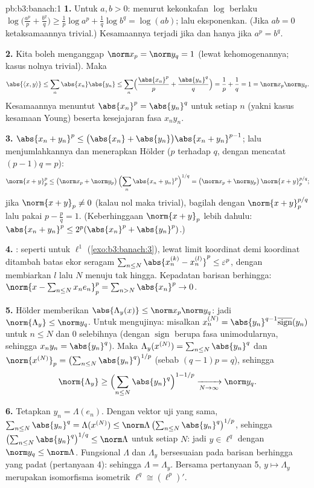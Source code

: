 \begin{solution}{pb:b3:banach:1}
\textbf{1.} Untuk $a, b > 0$: menurut kekonkafan $\log$ berlaku
$\log\bigl(\tfrac{a^p}p + \tfrac{b^q}q\bigr) \geq \tfrac1p\log
a^p + \tfrac1q\log b^q = \log(ab)$; lalu eksponenkan. (Jika $ab = 0$
ketaksamaannya trivial.) Kesamaannya terjadi jika dan hanya jika $a^p = b^q$.

\textbf{2.} Kita boleh menganggap $\norm x_p = \norm y_q = 1$
(lewat kehomogenannya; kasus nolnya trivial). Maka
\[
\abs{\langle x, y\rangle} \leq \sum_n\abs{x_n}\abs{y_n}
\leq \sum_n\Bigl(\frac{\abs{x_n}^p}p +
\frac{\abs{y_n}^q}q\Bigr) = \frac1p + \frac1q = 1 =
\norm x_p\norm y_q .
\]
Kesamaannya menuntut $\abs{x_n}^p = \abs{y_n}^q$ untuk setiap $n$
(yakni kasus kesamaan Young) beserta kesejajaran fasa
$x_ny_n$.

\textbf{3.} $\abs{x_n + y_n}^p \leq \bigl(\abs{x_n} +
\abs{y_n}\bigr)\abs{x_n + y_n}^{p-1}$; lalu menjumlahkannya dan menerapkan
Hölder ($p$ terhadap $q$, dengan mencatat $(p - 1)q = p$):
\[
\norm{x + y}_p^p \leq \bigl(\norm x_p + \norm
y_p\bigr)\,\Bigl(\sum_n\abs{x_n + y_n}^{p}\Bigr)^{1/q}
= \bigl(\norm x_p + \norm y_p\bigr)\,\norm{x+y}_p^{p/q};
\]
jika $\norm{x + y}_p \neq 0$ (kalau nol maka trivial), bagilah dengan
$\norm{x+y}_p^{p/q}$ lalu pakai $p - \frac pq = 1$. (Keberhinggaan
$\norm{x+y}_p$ lebih dahulu: $\abs{x_n+y_n}^p \leq
2^p(\abs{x_n}^p + \abs{y_n}^p)$.)

\textbf{4.} : seperti untuk $\ell^1$
(\cref{exo:b3:banach:3}), lewat limit koordinat demi koordinat ditambah
batas ekor seragam $\sum_{n\leq N}\abs{x^{(k)}_n - x^{(l)}_n}^p
\leq \varepsilon^p$, dengan membiarkan $l$ lalu $N$ menuju tak hingga.
Kepadatan barisan berhingga: $\norm{x - \sum_{n\leq
N}x_ne_n}_p^p = \sum_{n > N}\abs{x_n}^p \to 0$.

\textbf{5.} Hölder memberikan $\abs{\Lambda_y(x)} \leq \norm
x_p\norm y_q$: jadi $\norm{\Lambda_y} \leq \norm y_q$. Untuk mengujinya: misalkan
$x^{(N)}_n = \abs{y_n}^{q-1}\overline{\operatorname{sign}}(y_n)$
untuk $n \leq N$ dan $0$ selebihnya (dengan $\operatorname{sign}$ berupa
fasa unimodularnya, sehingga $x_ny_n = \abs{y_n}^q$). Maka
$\Lambda_y(x^{(N)}) = \sum_{n\leq N}\abs{y_n}^q$ dan
$\norm{x^{(N)}}_p = \bigl(\sum_{n\leq
N}\abs{y_n}^{q}\bigr)^{1/p}$ (sebab $(q-1)p = q$), sehingga
\[
\norm{\Lambda_y} \geq \Bigl(\sum_{n\leq
N}\abs{y_n}^q\Bigr)^{1 - 1/p} \xrightarrow[N\to\infty]{}
\norm y_q .
\]

\textbf{6.} Tetapkan $y_n = \Lambda(e_n)$. Dengan vektor uji yang
sama, $\sum_{n \leq N}\abs{y_n}^q = \Lambda(x^{(N)}) \leq
\norm\Lambda\,\bigl(\sum_{n\leq N}\abs{y_n}^q\bigr)^{1/p}$,
sehingga $\bigl(\sum_{n\leq N}\abs{y_n}^q\bigr)^{1/q} \leq
\norm\Lambda$ untuk setiap $N$: jadi $y \in \ell^q$ dengan $\norm y_q \leq
\norm\Lambda$. Fungsional $\Lambda$ dan $\Lambda_y$ bersesuaian
pada barisan berhingga yang padat (pertanyaan 4): sehingga $\Lambda =
\Lambda_y$. Bersama pertanyaan 5, $y \mapsto \Lambda_y$ merupakan
isomorfisma isometrik $\ell^q \cong (\ell^p)'$.


\end{solution}
